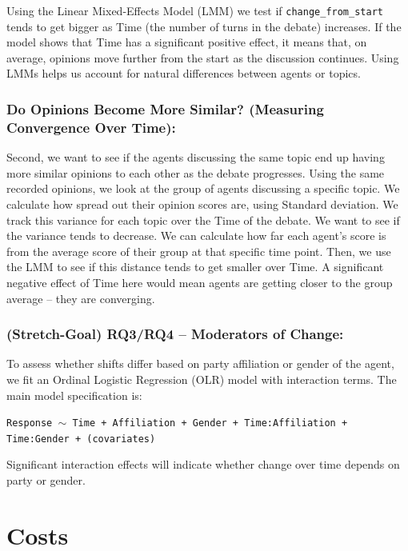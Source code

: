 \documentclass[12pt]{article}
\begin{document}
\begin{multicols}{2}
Using the Linear Mixed-Effects Model (LMM) we test if \texttt{change\_from\_start} tends to get bigger as Time (the number of turns in the debate) increases. If the model shows that Time has a significant positive effect, it means that, on average, opinions move further from the start as the discussion continues. Using LMMs helps us account for natural differences between agents or topics. 

\subsubsection{Do Opinions Become More Similar? (Measuring Convergence Over Time):}

Second, we want to see if the agents discussing the same topic end up having more similar opinions to each other as the debate progresses. Using the same recorded opinions, we look at the group of agents discussing a specific topic. We calculate how spread out their opinion scores are, using Standard deviation. We track this variance for each topic over the Time of the debate. We want to see if the variance tends to decrease. We can calculate how far each agent's score is from the average score of their group at that specific time point. Then, we use the LMM to see if this distance tends to get smaller over Time. A significant negative effect of Time here would mean agents are getting closer to the group average – they are converging.

\subsubsection{(Stretch-Goal) RQ3/RQ4 – Moderators of Change:}
To assess whether shifts differ based on party affiliation or gender of the agent, we fit an Ordinal Logistic Regression (OLR) model with interaction terms. The main model specification is:

\texttt{Response $\sim$ Time + Affiliation + Gender + Time:Affiliation + Time:Gender + (covariates)}

Significant interaction effects will indicate whether change over time depends on party or gender.








\appendix




\section{Costs}


\end{multicols}
\end{document}
